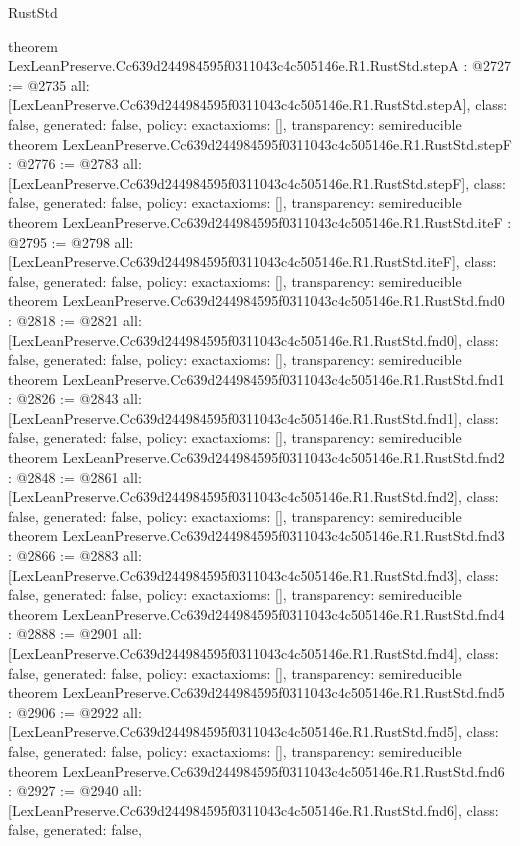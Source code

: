 \begin{lexlean}{RustStd}
\begin{coremodule}
{}
theorem LexLeanPreserve.Cc639d244984595f0311043c4c505146e.R1.RustStd.stepA : @2727 := @2735 {
  all: [LexLeanPreserve.Cc639d244984595f0311043c4c505146e.R1.RustStd.stepA],
  class: false,
  generated: false,
  policy: exact{axioms: []},
  transparency: semireducible
}
theorem LexLeanPreserve.Cc639d244984595f0311043c4c505146e.R1.RustStd.stepF : @2776 := @2783 {
  all: [LexLeanPreserve.Cc639d244984595f0311043c4c505146e.R1.RustStd.stepF],
  class: false,
  generated: false,
  policy: exact{axioms: []},
  transparency: semireducible
}
theorem LexLeanPreserve.Cc639d244984595f0311043c4c505146e.R1.RustStd.iteF : @2795 := @2798 {
  all: [LexLeanPreserve.Cc639d244984595f0311043c4c505146e.R1.RustStd.iteF],
  class: false,
  generated: false,
  policy: exact{axioms: []},
  transparency: semireducible
}
theorem LexLeanPreserve.Cc639d244984595f0311043c4c505146e.R1.RustStd.fnd0 : @2818 := @2821 {
  all: [LexLeanPreserve.Cc639d244984595f0311043c4c505146e.R1.RustStd.fnd0],
  class: false,
  generated: false,
  policy: exact{axioms: []},
  transparency: semireducible
}
theorem LexLeanPreserve.Cc639d244984595f0311043c4c505146e.R1.RustStd.fnd1 : @2826 := @2843 {
  all: [LexLeanPreserve.Cc639d244984595f0311043c4c505146e.R1.RustStd.fnd1],
  class: false,
  generated: false,
  policy: exact{axioms: []},
  transparency: semireducible
}
theorem LexLeanPreserve.Cc639d244984595f0311043c4c505146e.R1.RustStd.fnd2 : @2848 := @2861 {
  all: [LexLeanPreserve.Cc639d244984595f0311043c4c505146e.R1.RustStd.fnd2],
  class: false,
  generated: false,
  policy: exact{axioms: []},
  transparency: semireducible
}
theorem LexLeanPreserve.Cc639d244984595f0311043c4c505146e.R1.RustStd.fnd3 : @2866 := @2883 {
  all: [LexLeanPreserve.Cc639d244984595f0311043c4c505146e.R1.RustStd.fnd3],
  class: false,
  generated: false,
  policy: exact{axioms: []},
  transparency: semireducible
}
theorem LexLeanPreserve.Cc639d244984595f0311043c4c505146e.R1.RustStd.fnd4 : @2888 := @2901 {
  all: [LexLeanPreserve.Cc639d244984595f0311043c4c505146e.R1.RustStd.fnd4],
  class: false,
  generated: false,
  policy: exact{axioms: []},
  transparency: semireducible
}
theorem LexLeanPreserve.Cc639d244984595f0311043c4c505146e.R1.RustStd.fnd5 : @2906 := @2922 {
  all: [LexLeanPreserve.Cc639d244984595f0311043c4c505146e.R1.RustStd.fnd5],
  class: false,
  generated: false,
  policy: exact{axioms: []},
  transparency: semireducible
}
theorem LexLeanPreserve.Cc639d244984595f0311043c4c505146e.R1.RustStd.fnd6 : @2927 := @2940 {
  all: [LexLeanPreserve.Cc639d244984595f0311043c4c505146e.R1.RustStd.fnd6],
  class: false,
  generated: false,
}
\end{coremodule}
\end{lexlean}

